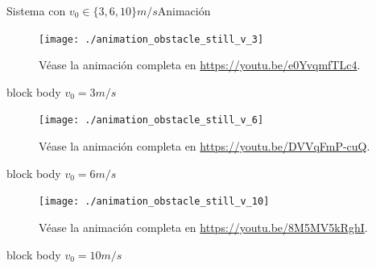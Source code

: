 \documentclass{beamer}
\begin{document}
            \begin{frame}{Sistema con $v_0 \in \{ 3, 6, 10\}m/s$}{Animación}
                \begin{minipage}[t]{0.3\textwidth}
                    \begin{figure}[H!]
                        \texttt{[image: ./animation\_obstacle\_still\_v\_3]}
                        \caption*{Véase la animación completa en \url{https://youtu.be/e0YvqmfTLc4}.}
                        \label{fig:a_2}
                    \end{figure}
                    \begin{beamercolorbox}[sep=5pt,center]{block body}
                        \centering
                        \small{$v_0=3m/s$}
                    \end{beamercolorbox}
                \end{minipage}
                \hfill
                \begin{minipage}[t]{0.30\textwidth}
                    \begin{figure}[H!]
                        \texttt{[image: ./animation\_obstacle\_still\_v\_6]}
                        \caption*{Véase la animación completa en \url{https://youtu.be/DVVqFmP-cuQ}.}
                        \label{fig:a_3}
                    \end{figure}
                    \begin{beamercolorbox}[sep=5pt,center]{block body}
                        \centering
                        \small{$v_0=6m/s$}
                    \end{beamercolorbox}
                \end{minipage}
                \hfill
                \begin{minipage}[t]{0.30\textwidth}
                    \begin{figure}[H!]
                        \texttt{[image: ./animation\_obstacle\_still\_v\_10]}
                        \caption*{Véase la animación completa en \url{https://youtu.be/8M5MV5kRghI}.}
                        \label{fig:a_4}
                    \end{figure}
                    \begin{beamercolorbox}[sep=5pt,center]{block body}
                        \centering
                        \small{$v_0=10m/s$}
                    \end{beamercolorbox}
                \end{minipage}
            \end{frame}
\end{document}
